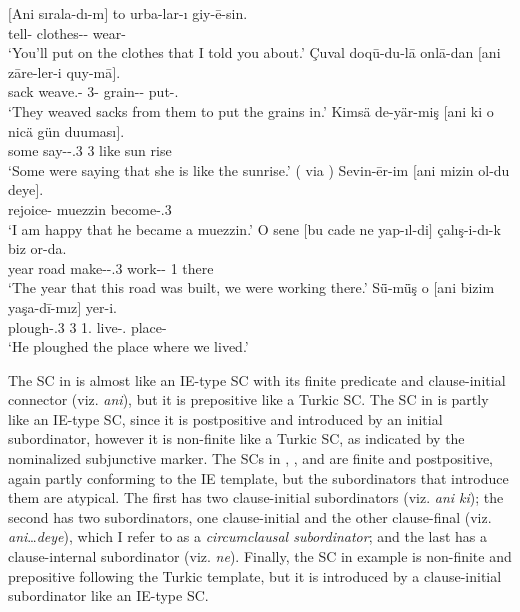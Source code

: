 \documentclass[output=paper,colorlinks,citecolor=brown]{langscibook}
\begin{document}
\ea \label{ex:keskin:x-clause2}
\gll $[$Ani	sırala-dı-m$]$	to	urba-lar-ı	giy-ē-sin.\\
\hphantom{[}\Conn{}	tell-\Sg{}	\Dist{}	clothes-\Pl-\Acc{}	wear-\Sg \\
\glt `You’ll put on the clothes that I told you about.' \citep[81]{Murtaza.2016}
\ex \label{ex:keskin:quyma}
\gll Çuval	doqū-du-lā	onlā-dan	$[$ani	zāre-ler-i	quy-mā$]$.\\
sack	weave.\Aor-\Pl{}	3\Pl-\Abl{}	\hphantom{[}\Conn{}	grain-\Pl-\Acc{}	put-\Nsub.\Dat{} {}\\
\glt `They weaved sacks from them to put the grains in.' \citep[214]{Haliloglu.2017}
\ex \label{ex:keskin:duumasi}
\gll Kimsä	de-yär-miş	$[$ani 	ki	o	nicä	gün duuması$]$.\\
some	say-\Prog-\Evid.3\Sg{}	\hphantom{[}\Conn{}	\Conn{}	3\Sg{}	like	sun rise\\
\glt `Some were saying that she is like the sunrise.' (\citealt[5]{Cimpoes.1988} via \citealt[157]{Ozkan.2007})
\ex \label{ex:keskin:mizin}
\gll Sevin-ēr-im	$[$ani	mizin	ol-du	deye$]$.\\
rejoice-\Sg{}	\hphantom{[}\Conn{}	muezzin	become-\Pst.3\Sg{}	\Conn{}\\
\glt `I am happy that he became a muezzin.' \citep[112]{Murtaza.2016}
\ex \label{ex:keskin:cade}
\gll O	sene	$[$bu	cade	ne	yap-ıl-di$]$	çalış-i-dı-k 	biz	or-da.\\
\Dist{}	year	\hphantom{[}\Prox{}	road	\Conn{}	make-\Pass-\Pst.3\Sg{}	work-\Prog-\Pl{}	1\Pl{}	there\\
\glt `The year that this road was built, we were working there.' \citep[255]{Sulcevsi.2019}
\glt
\ex \label{ex:keskin:yasadimiz}
\gll Sǖ-mǖş	o	$[$ani	bizim	yaşa-dī-mız$]$	yer-i.\\
plough-\Evid.3\Sg{}	3\Sg{}	\hphantom{[}\Conn{}	1\Pl.\Gen{}	live-\Pl.\Poss{}	place-\Acc\\
\glt `He ploughed the place where we lived.' \citep[230]{Karasinik.2011}
\z

\noindent
The SC in  is almost like an IE-type SC with its finite predicate and clause-initial connector (viz. \textit{ani}), but it is prepositive like a Turkic SC. The SC in  is partly like an IE-type SC, since it is postpositive and introduced by an initial subordinator, however it is non-finite like a Turkic SC, as indicated by the nominalized subjunctive marker. The SCs in , , and  are finite and postpositive, again partly conforming to the IE template, but the subordinators that introduce them are atypical. The first has two clause-initial subordinators (viz. \textit{ani ki}); the second has two subordinators, one clause-initial and the other clause-final (viz. \textit{ani}\ldots{}\textit{deye}), which I refer to as a \textit{circumclausal subordinator}; and the last has a clause-internal subordinator (viz. \textit{ne}). Finally, the SC in example  is non-finite and prepositive following the Turkic template, but it is introduced by a clause-initial subordinator like an IE-type SC.
\end{document}
